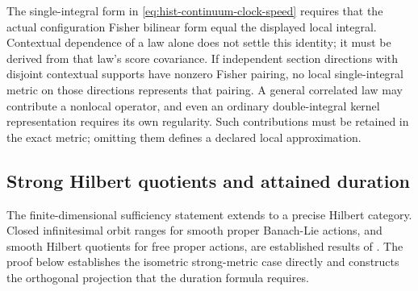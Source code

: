 The single-integral form in \eqref{eq:hist-continuum-clock-speed} requires
that the actual configuration Fisher bilinear form equal the displayed
local integral. Contextual dependence of a law alone does not settle this
identity; it must be derived from that law's score covariance. If independent
section directions with disjoint contextual supports have nonzero Fisher
pairing, no local single-integral metric on those directions represents
that pairing. A general correlated law may contribute a nonlocal operator,
and even an ordinary double-integral kernel representation requires its own
regularity. Such contributions must be retained in the exact metric;
omitting them defines a declared local approximation. 

\subsection{Strong Hilbert quotients and attained duration}
\label{sec:hist-strong-hilbert-quotient}

The finite-dimensional sufficiency statement extends to a precise Hilbert
category. Closed infinitesimal orbit ranges for smooth proper Banach-Lie
actions, and smooth Hilbert quotients for free proper actions, are established
results of \citet[Theorem 2.1 and Corollary 2.5]{JotzNeeb2008}. The proof below
establishes the isometric strong-metric case directly and constructs the
orthogonal projection that the duration formula requires.

